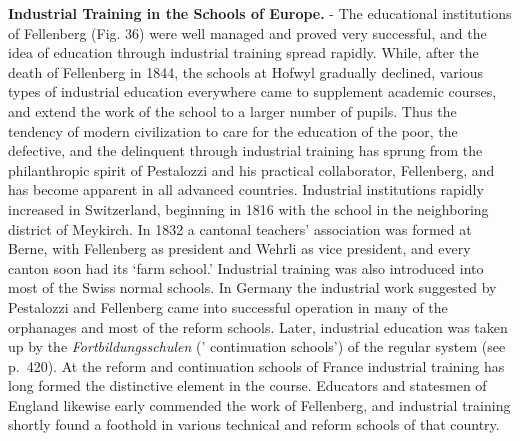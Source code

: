 \documentclass[]{book}
\begin{document}
\textbf{Industrial Training in the Schools of Europe.} - The educational institutions of Fellenberg (Fig. 36) were well managed and proved very successful, and the idea of education through industrial training spread rapidly. While, after the death of Fellenberg in 1844, the schools at Hofwyl gradually declined, various types of industrial education everywhere came to supplement academic courses, and extend the work of the school to a larger number of pupils. Thus the tendency of modern civilization to care for the education of the poor, the defective, and the delinquent through industrial training has sprung from the philanthropic spirit of Pestalozzi and his practical collaborator, Fellenberg, and has become apparent in all advanced countries. Industrial institutions rapidly increased in Switzerland, beginning in 1816 with the school in the neighboring district of Meykirch. In 1832 a cantonal teachers' association was formed at Berne, with Fellenberg as president and Wehrli as vice president, and every canton soon had its `farm school.' Industrial training was also introduced into most of the Swiss normal schools. In Germany the industrial work suggested by Pestalozzi and Fellenberg came into successful operation in many of the orphanages and most of the reform schools. Later, industrial education was taken up by the \emph{Fortbildungsschulen} (' continuation schools') of the regular system (see p.~420). At the reform and continuation schools of France industrial training has long formed the distinctive element in the course. Educators and statesmen of England likewise early commended the work of Fellenberg, and industrial training shortly found a foothold in various technical and reform schools of that country.
\end{document}
